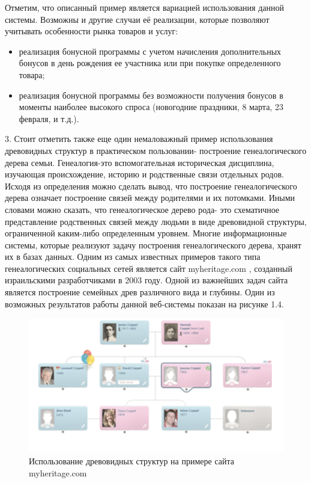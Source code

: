 \documentclass[a4paper,14pt]{extreport}
\theoremstyle{definition}
\begin{document}
Отметим, что описанный пример является вариацией использования данной системы. Возможны и другие случаи её реализации, которые позволяют учитывать особенности рынка товаров и услуг:
\begin{itemize}
\item реализация бонусной программы с учетом начисления дополнительных бонусов в день рождения ее участника или при покупке определенного товара;
\item реализация бонусной программы без возможности получения бонусов в моменты наиболее высокого спроса (новогодние праздники, 8 марта, 23 февраля, и т.д.).
\end{itemize}

3. Стоит отметить также еще один немаловажный пример использования древовидных структур в практическом пользовании- построение генеалогического дерева семьи. Генеалогия-это вспомогательная историческая дисциплина, изучающая происхождение, историю и родственные связи отдельных родов. Исходя из определения можно сделать вывод, что построение генеалогического дерева означает построение связей между родителями и их потомками. Иными словами можно сказать, что генеалогическое дерево рода- это схематичное представление родственных связей между людьми в виде древовидной структуры, ограниченной каким-либо определенным уровнем. Многие информационные системы, которые реализуют задачу построения генеалогического дерева, хранят их в базах данных. Одним из самых известных примеров такого типа генеалогических социальных сетей является сайт myheritage.com , созданный израильскими разработчиками в 2003 году. Одной из важнейших задач сайта является построение семейных древ различного вида и глубины. Один из возможных результатов работы данной веб-системы показан на рисунке 1.4.

\begin{figure}[h!]
\begin{center}
\includegraphics[width=12cm]{47.png}
\caption{Использование древовидных структур на примере сайта myheritage.com}
\label{fig:3}
\end{center}
\end{figure}
\end{document}

